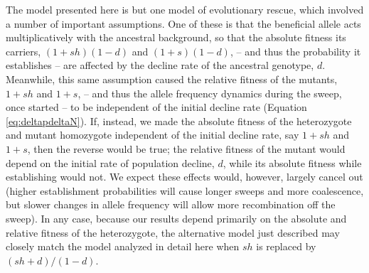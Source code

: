 \documentclass[]{article}
\begin{document}
The model presented here is but one model of evolutionary rescue, which involved a number of important assumptions.
One of these is that the beneficial allele acts multiplicatively with the ancestral background, so that the absolute fitness its carriers, $(1+s h)(1-d)$ and $(1+s)(1-d)$, -- and thus the probability it establishes -- are affected by the decline rate of the ancestral genotype, $d$.
Meanwhile, this same assumption caused the relative fitness of the mutants, $1+sh$ and $1+s$, -- and thus the allele frequency dynamics during the sweep, once started -- to be independent of the initial decline rate (Equation \ref{eq:deltapdeltaN}).
If, instead, we made the absolute fitness of the heterozygote and mutant homozygote independent of the initial decline rate, say $1 + s h$ and $1 + s$, then the reverse would be true; the relative fitness of the mutant would depend on the initial rate of population decline, $d$, while its absolute fitness while establishing would not. 
We expect these effects would, however, largely cancel out (higher establishment probabilities will cause longer sweeps and more coalescence, but slower changes in allele frequency will allow more recombination off the sweep).
In any case, because our results depend primarily on the absolute and relative fitness of the heterozygote, the alternative model just described may closely match the model analyzed in detail here when $s h$ is replaced by $(s h+d)/(1-d)$.
\end{document}

